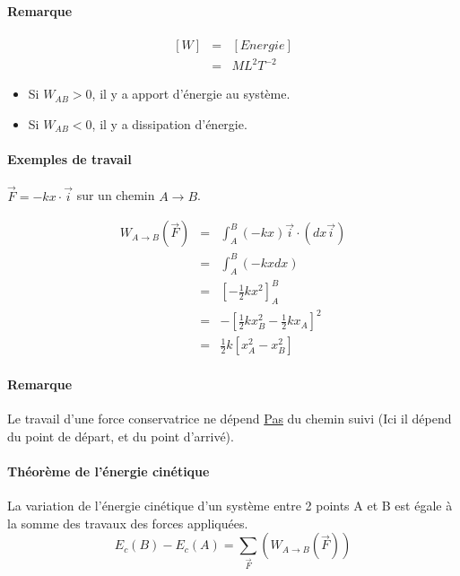 \paragraph{Remarque}
\[\begin{array}{rcl}
		{[W]} &=& {[Energie]} \\
			   &=& ML^2T^{-2}\end{array}\]

\begin{itemize}
	\item Si $W_{AB} > 0$, il y a apport d'énergie au système.
	\item Si $W_{AB} < 0$, il y a dissipation d'énergie.
\end{itemize}

\paragraph{Exemples de travail}

$\vec{F} = -kx\cdot \vec{i}$ sur un chemin $A \rightarrow B$.

\[\begin{array}{rcl}
		W_{A\to B}(\vec{F}) &=& \int_A^B(-kx)\vec{i} \cdot (dx\vec{i}) \\
							 &=& \int_A^B(-kxdx) \\
							&=& [-\frac{1}{2}kx^2]^B_A \\
							&=& -[\frac{1}{2}kx^2_B - \frac{1}{2}kx_A]^2 \\
				   &=& \frac{1}{2}k[x_A^2 - x^2_B]
\end{array}\]

\paragraph{Remarque} Le travail d'une force conservatrice ne dépend \ul{Pas} du chemin suivi (Ici il dépend du point de départ, et du point d'arrivé).

\paragraph{Théorème de l'énergie cinétique} La variation de l'énergie cinétique d'un système entre 2 points A et B est égale à la somme des travaux des forces appliquées.
\[E_c(B) - E_c(A) = \sum_{\vec{F}} (W_{A \to B}(\vec{F}))\]
